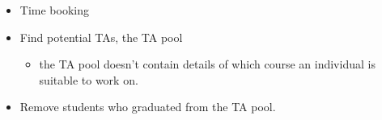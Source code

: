 \begin{frame}[fragile]\label<2>{WishTA}
  \begin{example}
    \begin{itemize}
      \item \alert<2>{Time booking}

      \item \alert<2>{Find potential TAs, the TA pool}
        \begin{itemize}
          \item the TA pool doesn't contain details of which course an 
            individual is suitable to work on.
        \end{itemize}

      \item \alert<2>{Remove students who graduated from the TA pool.}
    \end{itemize}
  \end{example}
\end{frame}

